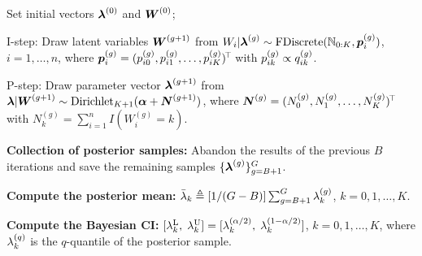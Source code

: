 \vkL
\IncMargin{0.1em}  %
\begin{algorithm}[H]  \label{alg1}
    \SetAlgoNoLine %

    \BlankLine

    Set initial vectors ${\boldsymbol{\lambda}}^{(0)}$ and ${\boldsymbol{W}}^{(0)}$; \\
     {
        \textsf{I-step}: Draw latent variables ${\boldsymbol{W}}^{(g+1)}$ from $W_i|{\boldsymbol{\lambda}}^{(g)} \sim \mbox{FDiscrete}({\mathbb{N}}_{0:K}, {\boldsymbol{p}}_i^{(g)})$, $i=1, \dots, n$, where ${\boldsymbol{p}}_i^{(g)} = (p_{i0}^{(g)}, p_{i1}^{(g)}, \dots, p_{iK}^{(g)})^{\!\top\!}$  with $p_{ik}^{(g)} \propto q_{ik}^{(g)}$.

        \textsf{P-step}: Draw parameter vector ${\boldsymbol{\lambda}}^{(g+1)}$ from ${\boldsymbol{\lambda}}|{\boldsymbol{W}}^{(g+1)} \sim \mbox{\rm Dirichlet}_{K+1}({\boldsymbol{\alpha}}+ {\boldsymbol{N}}^{(g+1)})$, where ${\boldsymbol{N}}^{(g)} = (N_0^{(g)}, N_1^{(g)}, \ldots, N_K^{(g)})^{\!\top\!}$ with $N_k^{(g)} = \sum_{i=1}^n I(W_i^{(g)} = k)$.
    }
    \textbf{Collection of posterior samples:} Abandon the results of the previous $B$ iterations and save the remaining samples $\{{\boldsymbol{\lambda}}^{(g)}\}_{g=B+1}^G$.

    \textbf{Compute the posterior mean:} $\bar{\lambda}_k \triangleq [1/(G-B)]\sum_{g=B+1}^G \lambda_k^{(g)}$, $k=0, 1, \dots, K$.

    \textbf{Compute the Bayesian CI:} $[\lambda_k^{\rm L},\; \lambda_k^{\rm U}] = [\lambda_k^{(\alpha/2)},\;\lambda_k^{(1-\alpha/2)}]$, $k=0, 1, \dots, K$, where $\lambda_k^{(q)}$ is the $q$-quantile of the posterior sample.
    \caption{\ Posterior mean and Bayesian CI via the DA algorithm}
\end{algorithm}
\DecMargin{0.1em} 